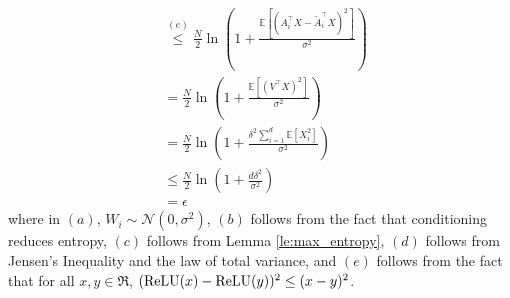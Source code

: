 \documentclass[twoside,11pt]{article}
\renewenvironment{proof}{\par\noindent{\bf Proof\ }}{\hfill\BlackBox\\[2mm]}
\newenvironment{proof}{\par\noindent{\bf Proof\ }}{\hfill\BlackBox\\[2mm]}
\newtheorem{lemma}[theorem]{Lemma}
\def\sign{{\rm sign}}
\def\relu{{\rm ReLU}}
\def\E{\mathbb{E}}
\def\H{\mathbb{H}}
\def\I{\mathbb{I}}
\begin{document}
\begin{proof}
\begin{align*}
        & \overset{(e)}{\leq} \frac{N}{2}\ln\left(1 + \frac{\E\left[\left(A_i^\top X - \tilde{A}_i^\top X\right)^2 \right]}{\sigma^2}\right)\\
        & = \frac{N}{2}\ln\left(1 + \frac{\E\left[\left(V^\top X\right)^2\right]}{\sigma^2}\right)\\
        & = \frac{N}{2}\ln\left(1 + \frac{\delta^2 \sum_{i=1}^{d}\E[X_i^2]}{\sigma^2}\right)\\
        & \leq \frac{N}{2}\ln\left(1 + \frac{d \delta^2}{\sigma^2}\right)\\
        & = \epsilon
    \end{align*}
    where in $(a)$, $W_i\sim\mathcal{N}(0, \sigma^2)$, $(b)$ follows from the fact that conditioning reduces entropy, $(c)$ follows from Lemma \ref{le:max_entropy}, $(d)$ follows from Jensen's Inequality and the law of total variance, and $(e)$ follows from the fact that for all $x, y \in\Re$, $(\relu(x) - \relu(y))^2 \leq (x-y)^2$.
\end{proof}


    
\end{document}
